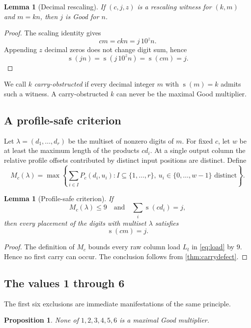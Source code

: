\documentclass[11pt]{article}
\newtheorem{lemma}[theorem]{Lemma}
\newtheorem{proposition}[theorem]{Proposition}
\newcommand{\ds}{\operatorname{s}}
\begin{document}
\begin{lemma}[Decimal rescaling]\label{lem:rescaling}
If $(c,j,z)$ is a rescaling witness for $(k,m)$ and $m=kn$, then $j$ is Good for $n$.
\end{lemma}

\begin{proof}
The scaling identity gives
\[
 cm=ckn=j\,10^z n.
\]
Appending $z$ decimal zeros does not change digit sum, hence
\[
 \ds(jn)=\ds(j\,10^z n)=\ds(cm)=j.
\]
\end{proof}

We call $k$ \emph{carry-obstructed} if every decimal integer $m$ with $\ds(m)=k$ admits such a witness.  A carry-obstructed $k$ can never be the maximal Good multiplier.

\subsection{A profile-safe criterion}
Let $\lambda=(d_1,\ldots,d_r)$ be the multiset of nonzero digits of $m$.  For fixed $c$, let $w$ be at least the maximum length of the products $cd_i$.  At a single output column the relative profile offsets contributed by distinct input positions are distinct.  Define
\begin{equation}\label{eq:profilemax}
 M_c(\lambda)=
 \max\left\{\sum_{i\in I}P_c(d_i,u_i):
 I\subseteq\{1,\ldots,r\},\ u_i\in\{0,\ldots,w-1\}
 \text{ distinct}\right\}.
\end{equation}

\begin{lemma}[Profile-safe criterion]\label{lem:profilesafe}
If
\[
  M_c(\lambda)\le9
  \quad\text{and}\quad
  \sum_i\ds(cd_i)=j,
\]
then every placement of the digits with multiset $\lambda$ satisfies
\[
  \ds(cm)=j.
\]
\end{lemma}

\begin{proof}
The definition of $M_c$ bounds every raw column load $L_t$ in \eqref{eq:load} by $9$.  Hence no first carry can occur.  The conclusion follows from \cref{thm:carrydefect}.
\end{proof}

\subsection{The values 1 through 6}
The first six exclusions are immediate manifestations of the same principle.

\begin{proposition}\label{prop:one-six}
None of $1,2,3,4,5,6$ is a maximal Good multiplier.
\end{proposition}
\end{document}
